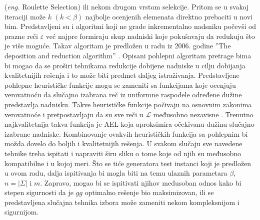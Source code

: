 \documentclass[12pt,oneside]{memoir}
\begin{document}
(\textit{eng.} Roulette Selection) ili nekom drugom vrstom selekcije.
Pritom se u svakoj iteraciji može $k$ $(k<\beta)$ najbolje ocenjenih elemenata
direktno prebaciti u novi bim.
Predstavljeni su i algoritmi koji ne grade inkrementalno nadsniku počevši 
od prazne reči $\varepsilon$ već najpre formiraju skup nadniski
koje pokušavaju da redukuju što je više moguće. Takav algoritam je predložen
u radu iz 2006. godine ''The deposition and reduction algorithm'' \cite{SCSSBetterSolution}.
Opisani pohlepni algoritam pretrage bima bi mogao da se proširi tehnikama redukcije dobijene
nadniske u cilju dobijanja kvalitetnijih rešenja i to može biti predmet daljeg
istraživanja. 
Predstavljene pohlepne heurističke funkcije mogu se zameniti
sa funkcijama koje ocenjuju verovatnoću da slučajno izabrana reč iz uniformne 
raspodele  određene dužine predstavlja nadnisku.
Takve heurističke funkcije počivaju na osnovnim zakonima verovatnoće i pretpostavljaju
da su sve reči u $\mathcal{L}$ međusobno nezavisne \cite{SCSBS}.
Trenutno najkvalitetnija takva funkcija je AEL koja aproksimira
očekivanu dužinu slučajno izabrane nadniske.
Kombinovanje ovakvih heurističkih funkcija sa pohlepnim bi možda dovelo
do boljih i kvalitetnijih rešenja.
U svakom slučaju sve navedene tehnike treba ispitati i napraviti širu sliku
o tome koje od njih su međusobno kompatibilne i u kojoj meri.
Što se tiće generatora test instanci koji je predložen u ovom radu,
dalja ispitivanja bi mogla biti na temu ulaznih parametara $\beta$, $n=|\Sigma|$ i $m$.
Zapravo, mogao bi se ispitivati njihov međusoban odnos
kako bi stepen sigurnosti da je $gg$ optimalno rešenje bio maksimizovan,
ili se predstavljena slučajna tehnika izbora može zameniti nekom kompleksnijom
i sigurnijom. 

% 


\literatura

\backmatter
\end{document}
